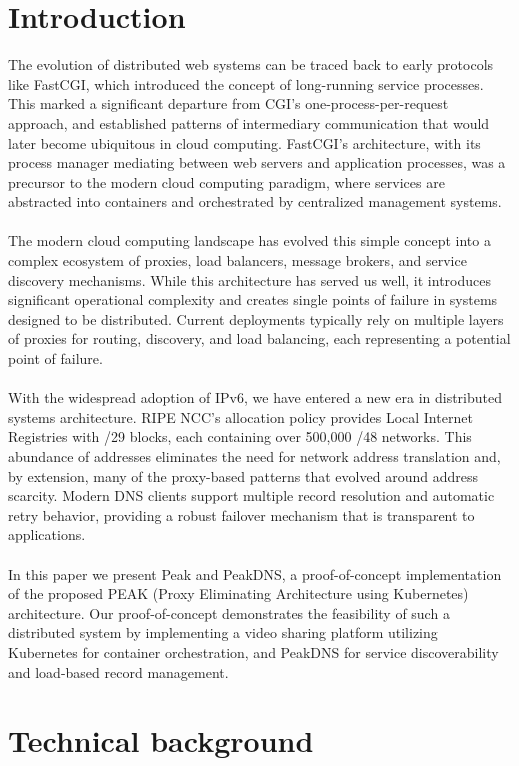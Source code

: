\documentclass[12pt]{article}
\begin{document}
\section{Introduction}
The evolution of distributed web systems can be traced back to early protocols like FastCGI, which introduced the concept of long-running service processes.
This marked a significant departure from CGI's one-process-per-request approach,
and established patterns of intermediary communication that would later become ubiquitous in cloud computing.
FastCGI's architecture, with its process manager mediating between web servers and application processes, was a precursor to the modern cloud computing paradigm,
where services are abstracted into containers and orchestrated by centralized management systems.
\\
\\
The modern cloud computing landscape has evolved this simple concept into a complex ecosystem of proxies,
load balancers, message brokers, and service discovery mechanisms. While this architecture has served us well, it introduces
significant operational complexity and creates single points of failure in systems designed to be distributed.
Current deployments typically rely on multiple layers of proxies for routing, discovery, and load balancing, each representing
a potential point of failure.
\\
\\
With the widespread adoption of IPv6, we have entered a new era in distributed systems architecture. RIPE NCC's allocation policy
provides Local Internet Registries with /29 blocks, each containing over 500,000 /48 networks. This abundance of addresses eliminates
the need for network address translation and, by extension, many of the proxy-based patterns that evolved around address scarcity.
Modern DNS clients support multiple record resolution and automatic retry behavior, providing a robust failover mechanism that is 
transparent to applications.
\\
\\
In this paper we present Peak and PeakDNS, a proof-of-concept implementation of the proposed PEAK (Proxy Eliminating Architecture using Kubernetes) architecture.
Our proof-of-concept demonstrates the feasibility of such a distributed system by implementing 
a video sharing platform utilizing Kubernetes for container orchestration,
and PeakDNS for service discoverability and load-based record management.


\section{Technical background}
\end{document}
